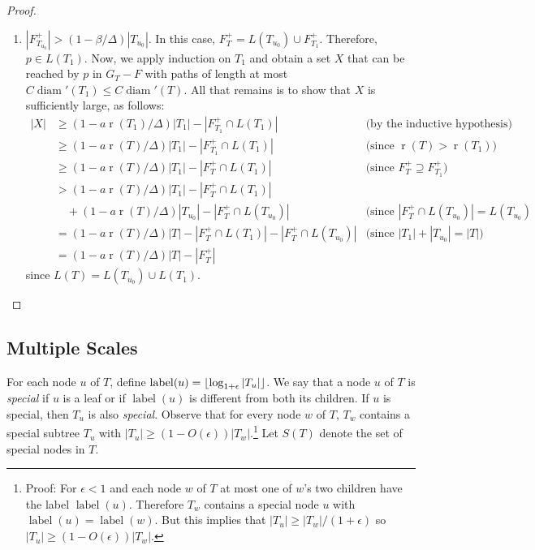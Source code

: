 \documentclass{patmorin}
\DeclareMathOperator{\rank}{r}
\DeclareMathOperator{\diam}{diam}
\DeclareMathOperator{\lbl}{label}
\begin{document}
\begin{proof}
\begin{enumerate}
    \item $|F^+_{T_{u_0}}|> (1-\beta/\Delta)|T_{u_0}|$.  In this case,
      $F^+_T= L(T_{u_0})\cup F^+_{T_1}$.  Therefore, $p\in L(T_1)$.
      Now, we apply induction on $T_1$ and obtain a set $X$ that can be
      reached by $p$ in $G_T-F$ with paths of length at most $C\diam'(T_1)\le
      C\diam'(T)$.  All that remains is to show that $X$ is sufficiently
      large, as follows:
  \begin{align*}
    |X| & \ge (1-a\rank(T_1)/\Delta)|T_1|-|F^+_{T_1} \cap L(T_1)| &
       \text{(by the inductive hypothesis)} \\
    & \ge (1-a\rank(T)/\Delta)|T_1|-|F^+_{T_1} \cap L(T_1)| 
     & \text{(since $\rank(T)>\rank(T_1)$)} \\
    & \ge (1-a\rank(T)/\Delta)|T_1|-|F^+_{T} \cap L(T_1)| 
    & \text{(since $F^+_T\supseteq F^+_{T_1}$)} \\
    & > (1-a\rank(T)/\Delta)|T_1|-|F^+_{T} \cap L(T_1)| \\
     & \quad {} + (1-a\rank(T)/\Delta)|T_{u_0}|-|F^+_{T}\cap L(T_{u_0})|
    & \text{(since $|F^+_T \cap L(T_{u_0})|=L(T_{u_0})$} \\
    & = (1-a\rank(T)/\Delta)|T|-|F^+_{T}\cap L(T_1)| - |F^+_T\cap L(T_{u_0})|
    & \text{(since $|T_1|+|T_{u_0}|=|T|$)} \\
    & = (1-a\rank(T)/\Delta)|T|-|F^+_{T}|  
  \end{align*}
  since $L(T)=L(T_{u_0})\cup L(T_1)$.
  \end{enumerate}
\end{proof}

\subsection{Multiple Scales}

For each node $u$ of $T$, define
$\lbl(u)=\floor{\log_{1+\epsilon}|T_u|}$. We say that a node $u$ of $T$
is \emph{special} if $u$ is a leaf or if $\lbl(u)$ is different from
both its children.  If $u$ is special, then $T_u$ is also \emph{special}.
Observe that for every node $w$ of $T$, $T_w$ contains a special subtree
$T_u$ with $|T_u|\ge (1-O(\epsilon))|T_w|$.\footnote{Proof: For $\epsilon < 1$ and each node $w$ of $T$ at most one of $w$'s two children have the label $\lbl(u)$.  Therefore $T_w$ contains a special node $u$ with $\lbl(u)=\lbl(w)$. But this implies that $|T_u|\ge |T_w|/(1+\epsilon)$ so $|T_u|\ge (1-O(\epsilon))|T_w|$.}  Let $S(T)$ denote the set of special nodes in $T$.
\end{document}
